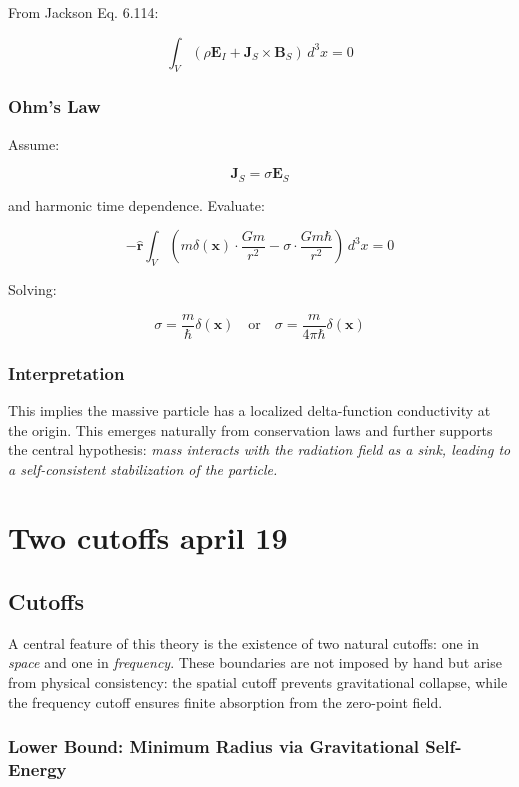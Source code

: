 \documentclass {article}
\renewcommand\vec{\mathbf}
\let\OldHat\hat
\renewcommand{\hat}[1]{\OldHat{\mathbf{#1}}}
\begin{document}
From Jackson Eq. 6.114:

\[
\int_V \left( \rho \vec{E}_I + \vec{J}_S \times \vec{B}_S \right) \, d^3x = 0
\]

\subsubsection*{Ohm’s Law}

Assume:

\[
\vec{J}_S = \sigma \vec{E}_S
\]

and harmonic time dependence. Evaluate:

\[
-\hat{r} \int_V \left( m \delta(\vec{x}) \cdot \frac{G m}{r^2} - \sigma \cdot \frac{G m \hbar}{r^2} \right) \, d^3x = 0
\]

Solving:

\[
\sigma = \frac{m}{\hbar} \delta(\vec{x}) \quad \text{or} \quad \sigma = \frac{m}{4 \pi \hbar} \delta(\vec{x})
\]

\subsubsection*{Interpretation}

This implies the massive particle has a localized delta-function conductivity at the origin. This emerges naturally from conservation laws and further supports the central hypothesis: \textit{mass interacts with the radiation field as a sink, leading to a self-consistent stabilization of the particle.}




\newpage

\section{Two cutoffs april 19}
\subsection{Cutoffs}

A central feature of this theory is the existence of two natural cutoffs: one in \textit{space} and one in \textit{frequency}. These boundaries are not imposed by hand but arise from physical consistency: the spatial cutoff prevents gravitational collapse, while the frequency cutoff ensures finite absorption from the zero-point field.

\subsubsection*{Lower Bound: Minimum Radius via Gravitational Self-Energy}
\end{document}
